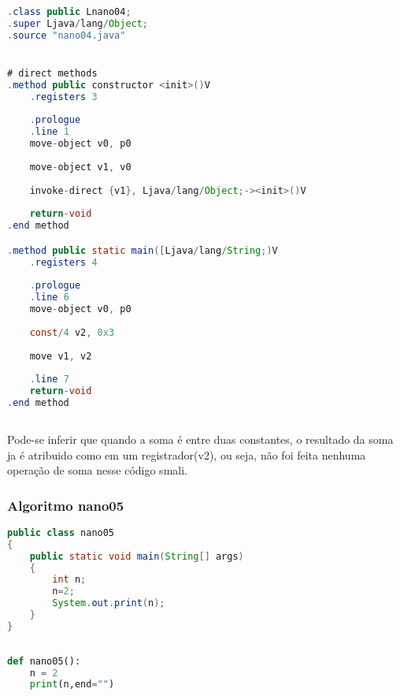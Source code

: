 \documentclass[hidelinks,12pt]{article}
\begin{document}
	\begin{lstlisting}[caption=Smali resultante do .java,language=java]
.class public Lnano04;
.super Ljava/lang/Object;
.source "nano04.java"


# direct methods
.method public constructor <init>()V
	.registers 3
	
	.prologue
	.line 1
	move-object v0, p0
	
	move-object v1, v0
	
	invoke-direct {v1}, Ljava/lang/Object;-><init>()V
	
	return-void
.end method

.method public static main([Ljava/lang/String;)V
	.registers 4
	
	.prologue
	.line 6
	move-object v0, p0
	
	const/4 v2, 0x3
	
	move v1, v2
	
	.line 7
	return-void
.end method	
	
	\end{lstlisting}
	
	Pode-se inferir que quando a soma é entre duas constantes, o resultado da soma ja é atribuido como em um registrador(v2), ou seja, não foi feita nenhuma operação de soma nesse código smali.
	
	\subsubsection{Algoritmo nano05}
	
	\begin{lstlisting}[caption=Código em Java,language=java]
public class nano05
{
	public static void main(String[] args)
	{
		int n;
		n=2;
		System.out.print(n);
	}
}	
	
	\end{lstlisting}
	
	\begin{lstlisting}[caption=Código em python,language=Python]
def nano05():
	n = 2 
	print(n,end="")	
	
	\end{lstlisting}
	
\end{document}
